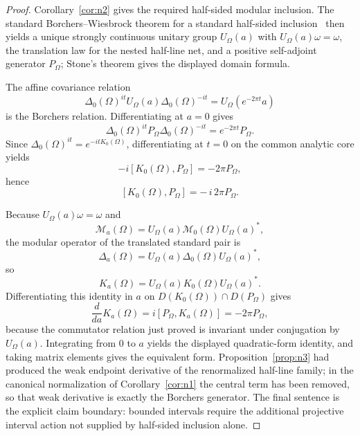 \documentclass[11pt]{article}
\begin{document}
\begin{proof}
Corollary~\ref{cor:n2} gives the required half-sided modular inclusion. The standard Borchers--Wiesbrock theorem for a standard half-sided inclusion~\cite{wiesbrock93} then yields a unique strongly continuous unitary group \(U_\Omega(a)\) with \(U_\Omega(a)\omega=\omega\), the translation law for the nested half-line net, and a positive self-adjoint generator \(P_\Omega\); Stone's theorem gives the displayed domain formula.

The affine covariance relation
\[
\Delta_0(\Omega)^{it}U_\Omega(a)\Delta_0(\Omega)^{-it}
=
U_\Omega(e^{-2\pi t}a)
\]
is the Borchers relation. Differentiating at \(a=0\) gives
\[
\Delta_0(\Omega)^{it}P_\Omega\Delta_0(\Omega)^{-it}
=
e^{-2\pi t}P_\Omega.
\]
Since \(\Delta_0(\Omega)^{it}=e^{-itK_0(\Omega)}\), differentiating at \(t=0\) on the common analytic core yields
\[
-i[K_0(\Omega),P_\Omega]=-2\pi P_\Omega,
\]
hence
\[
[K_0(\Omega),P_\Omega]=-\,i\,2\pi P_\Omega.
\]

Because \(U_\Omega(a)\omega=\omega\) and
\[
\mathcal M_a(\Omega)=U_\Omega(a)\mathcal M_0(\Omega)U_\Omega(a)^*,
\]
the modular operator of the translated standard pair is
\[
\Delta_a(\Omega)=U_\Omega(a)\Delta_0(\Omega)U_\Omega(a)^*,
\]
so
\[
K_a(\Omega)=U_\Omega(a)K_0(\Omega)U_\Omega(a)^*.
\]
Differentiating this identity in \(a\) on \(D(K_0(\Omega))\cap D(P_\Omega)\) gives
\[
\frac{d}{da}K_a(\Omega)
=
i[P_\Omega,K_a(\Omega)]
=
-2\pi P_\Omega,
\]
because the commutator relation just proved is invariant under conjugation by \(U_\Omega(a)\). Integrating from \(0\) to \(a\) yields the displayed quadratic-form identity, and taking matrix elements gives the equivalent form. Proposition~\ref{prop:n3} had produced the weak endpoint derivative of the renormalized half-line family; in the canonical normalization of Corollary~\ref{cor:n1} the central term has been removed, so that weak derivative is exactly the Borchers generator. The final sentence is the explicit claim boundary: bounded intervals require the additional projective interval action not supplied by half-sided inclusion alone.
\end{proof}
\end{document}
